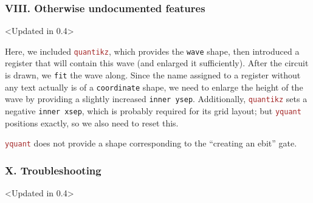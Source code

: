 \documentclass{scrartcl}
\makeatletter
\newenvironment{codeexample*}{%
   \VerbatimEnvironment%
   \let\FVB@VerbatimOut\minted@FVB@VerbatimOut
   \let\FVE@VerbatimOut\minted@FVE@VerbatimOut
   \minted@configlang{tex}%
   \minted@fvset
   \begin{VerbatimOut}[codes={\catcode`\^^I=12},firstline,lastline]{\minted@jobname.pyg}%
}{
   \end{VerbatimOut}%
   \minted@langlinenoson%
   \begin{adjustbox}{center}
       \minted@jobname.pyg %
   \end{adjustbox}\nopagebreak
   \minted@pygmentize{\minted@lang}%
   \minted@langlinenosoff%
   \par%
}
\def\pkg#1{\textcolor{brown}{\texttt{#1}}}
\def\Yquant{\pkg{yquant}}
\makeatother
\begin{document}
         \subsubsection{VIII. Otherwise undocumented features}
            \begin{example}<Updated in 0.4>
               \begin{codeexample*}
               \end{codeexample*}
               Here, we included \pkg{quantikz}, which provides the \texttt{wave} shape, then introduced a register that will contain this wave (and enlarged it sufficiently).
               After the circuit is drawn, we \texttt{fit} the wave along.
               Since the name assigned to a register without any text actually is of a \texttt{coordinate} shape, we need to enlarge the height of the wave by providing a slightly increased \texttt{inner ysep}.
               Additionally, \pkg{quantikz} sets a negative \texttt{inner xsep}, which is probably required for its grid layout; but \Yquant{} positions exactly, so we also need to reset this.
            \end{example}

            \Yquant{} does not provide a shape corresponding to the ``creating an ebit'' gate.

         \clearpage
         \subsubsection{X. Troubleshooting}
            \begin{example}<Updated in 0.4>
               \begin{codeexample*}
               \end{codeexample*}
            \end{example}
      \endgroup
\end{document}
